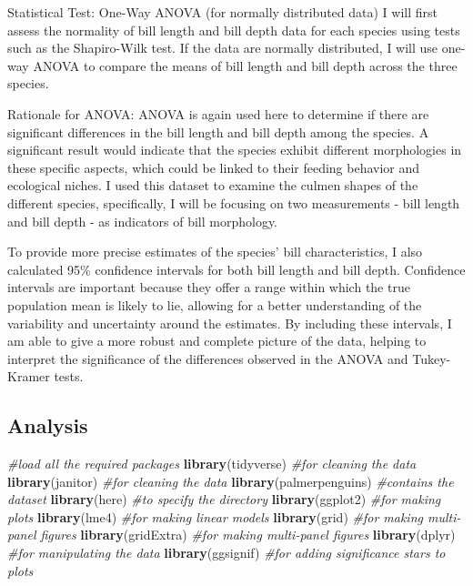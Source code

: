 \documentclass[
]{article}
\newenvironment{Shaded}{\begin{snugshade}}{\end{snugshade}}
\newcommand{\CommentTok}[1]{\textcolor[rgb]{0.56,0.35,0.01}{\textit{#1}}}
\newcommand{\FunctionTok}[1]{\textcolor[rgb]{0.13,0.29,0.53}{\textbf{#1}}}
\newcommand{\NormalTok}[1]{#1}
\begin{document}
Statistical Test: One-Way ANOVA (for normally distributed data) I will
first assess the normality of bill length and bill depth data for each
species using tests such as the Shapiro-Wilk test. If the data are
normally distributed, I will use one-way ANOVA to compare the means of
bill length and bill depth across the three species.

Rationale for ANOVA: ANOVA is again used here to determine if there are
significant differences in the bill length and bill depth among the
species. A significant result would indicate that the species exhibit
different morphologies in these specific aspects, which could be linked
to their feeding behavior and ecological niches. I used this dataset to
examine the culmen shapes of the different species, specifically, I will
be focusing on two measurements - bill length and bill depth - as
indicators of bill morphology.

To provide more precise estimates of the species' bill characteristics,
I also calculated 95\% confidence intervals for both bill length and
bill depth. Confidence intervals are important because they offer a
range within which the true population mean is likely to lie, allowing
for a better understanding of the variability and uncertainty around the
estimates. By including these intervals, I am able to give a more robust
and complete picture of the data, helping to interpret the significance
of the differences observed in the ANOVA and Tukey-Kramer tests.

\subsection{Analysis}\label{analysis}

\begin{Shaded}
\begin{Highlighting}[]
\CommentTok{\#load all the required packages}
\FunctionTok{library}\NormalTok{(tidyverse) }\CommentTok{\#for cleaning the data}
\FunctionTok{library}\NormalTok{(janitor) }\CommentTok{\#for cleaning the data}
\FunctionTok{library}\NormalTok{(palmerpenguins) }\CommentTok{\#contains the dataset}
\FunctionTok{library}\NormalTok{(here) }\CommentTok{\#to specify the directory}
\FunctionTok{library}\NormalTok{(ggplot2) }\CommentTok{\#for making plots}
\FunctionTok{library}\NormalTok{(lme4) }\CommentTok{\#for making linear models}
\FunctionTok{library}\NormalTok{(grid) }\CommentTok{\#for making multi{-}panel figures}
\FunctionTok{library}\NormalTok{(gridExtra) }\CommentTok{\#for making multi{-}panel figures}
\FunctionTok{library}\NormalTok{(dplyr) }\CommentTok{\#for manipulating the data}
\FunctionTok{library}\NormalTok{(ggsignif) }\CommentTok{\#for adding significance stars to plots}
\end{Highlighting}
\end{Shaded}
\end{document}
